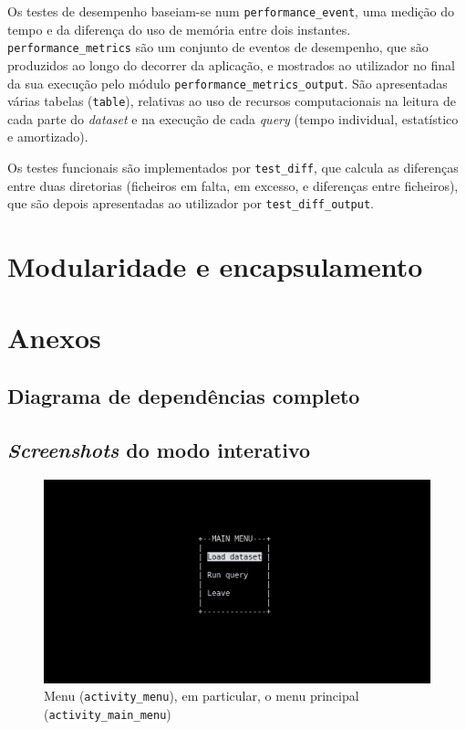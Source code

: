 \documentclass[12pt, a4paper]{article}
\begin{document}
Os testes de desempenho baseiam-se num \texttt{performance\_event}, uma medição do tempo e da
diferença do uso de memória entre dois instantes. \texttt{performance\_metrics} são um conjunto de
eventos de desempenho, que são produzidos ao longo do decorrer da aplicação, e mostrados ao
utilizador no final da sua execução pelo módulo \texttt{performance\_metrics\_output}. São
apresentadas várias tabelas (\texttt{table}), relativas ao uso de recursos computacionais na leitura
de cada parte do \emph{dataset} e na execução de cada \emph{query} (tempo individual, estatístico e
amortizado).

Os testes funcionais são implementados por \texttt{test\_diff}, que calcula as diferenças entre
duas diretorias (ficheiros em falta, em excesso, e diferenças entre ficheiros), que são depois
apresentadas ao utilizador por \texttt{test\_diff\_output}.

\section{Modularidade e encapsulamento}
\label{sec:modularity-and-encapsulation}

\pagebreak
\section{Anexos}
\label{sec:annexes}

\subsection{Diagrama de dependências completo}
\label{sec:complete-diagram}


\subsection{\emph{Screenshots} do modo interativo}
\label{sec:interactive-screenshots}

\begin{figure}[ht]
    \centering
    \includegraphics[scale=0.25]{res-fase2/interactive_screenshots/main_menu.png}
	\caption{Menu (\texttt{activity\_menu}), em particular, o menu principal
	         (\texttt{activity\_main\_menu})}
    \label{fig:main_menu}
\end{figure}
\end{document}
